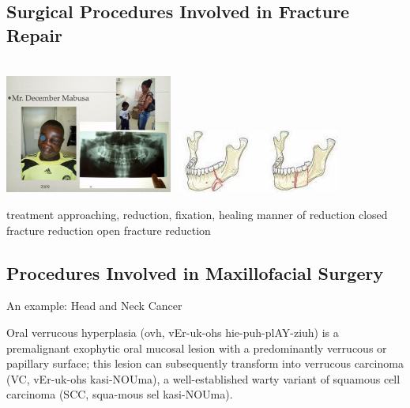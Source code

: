 \documentclass[
paper=landscape,
paper=160mm:90mm, %
fontsize=11pt, %
pagesize, %
parskip=half-, %
]{scrartcl} %
\newenvironment{WrapText1}[3][r]
{\wrapfigure[#2]{#1}{#3}}
{\endwrapfigure}
\newcommand{\wrapr}[6]{
\begin{minipage}{\linewidth}\mbox{}\\
\vspace{#1}
\begin{WrapText1}{#2}{#3}
\vspace{#4}#5\end{WrapText1}#6
\end{minipage}}
\theoremstyle{mythmstyle} %
\begin{document}
\clearpage
%
\subsection{Surgical Procedures Involved in Fracture Repair}

\wrapr{-8mm}{7}{6cm}{-1mm}
{%
\includegraphics[width=5.5cm]{Mabusa.png}
\includegraphics[width=5.5cm]{reduction_mandible.jpeg}
} %
{%
\begin{outline}
\1 treatment
    \2 approaching, reduction, fixation, healing
\1  manner of reduction
    \2 closed fracture reduction
    \2 open fracture reduction
\end{outline}
} %

\clearpage
%
\subsection{Procedures Involved in Maxillofacial Surgery}

An example: Head and Neck Cancer

Oral verrucous hyperplasia (\acrshort{ovh}, vEr-uk-ohs hie-puh-plAY-ziuh) is a premalignant exophytic oral mucosal lesion with a predominantly verrucous or papillary surface; this lesion can subsequently transform into verrucous carcinoma (VC, vEr-uk-ohs kasi-NOUma), a well-established warty variant of squamous cell carcinoma (SCC, squa-mous sel kasi-NOUma).


\thispagestyle{headings}
\end{document}
